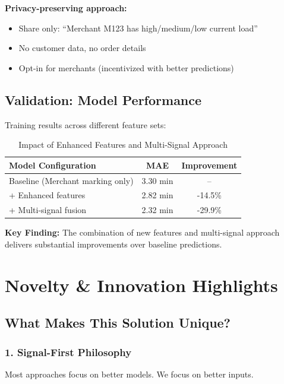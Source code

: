 \documentclass[11pt,a4paper]{article}
\begin{document}
\textbf{Privacy-preserving approach:}
\begin{itemize}
    \item Share only: ``Merchant M123 has high/medium/low current load''
    \item No customer data, no order details
    \item Opt-in for merchants (incentivized with better predictions)
\end{itemize}

\subsection{Validation: Model Performance}

Training results across different feature sets:

\begin{table}[H]
\centering
\caption{Impact of Enhanced Features and Multi-Signal Approach}
\begin{tabular}{@{}lcc@{}}
\toprule
\textbf{Model Configuration} & \textbf{MAE} & \textbf{Improvement} \\ \midrule
Baseline (Merchant marking only) & 3.30 min & -- \\
+ Enhanced features & 2.82 min & -14.5\% \\
+ Multi-signal fusion & 2.32 min & -29.9\% \\
\bottomrule
\end{tabular}
\end{table}

\textbf{Key Finding:} The combination of new features and multi-signal approach delivers substantial improvements over baseline predictions.

\newpage

\section{Novelty \& Innovation Highlights}

\subsection{What Makes This Solution Unique?}

\subsubsection{1. Signal-First Philosophy}

Most approaches focus on better models. We focus on better inputs.
\end{document}
